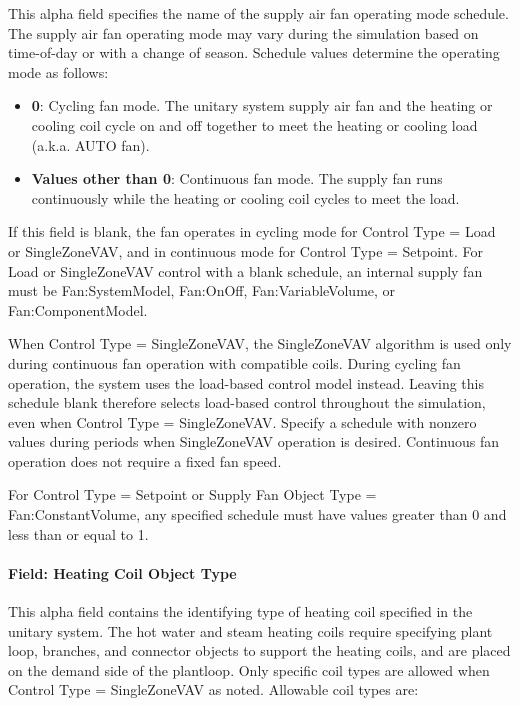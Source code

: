 This alpha field specifies the name of the supply air fan operating mode schedule. The supply air fan operating mode may vary during the simulation based on time-of-day or with a change of season. Schedule values determine the operating mode as follows:

\begin{itemize}
\item
  \textbf{0}: Cycling fan mode. The unitary system supply air fan and the heating or cooling coil cycle on and off together to meet the heating or cooling load (a.k.a. AUTO fan).
\item
  \textbf{Values other than 0}: Continuous fan mode. The supply fan runs continuously while the heating or cooling coil cycles to meet the load.
\end{itemize}

If this field is blank, the fan operates in cycling mode for Control Type = Load or SingleZoneVAV, and in continuous mode for Control Type = Setpoint. For Load or SingleZoneVAV control with a blank schedule, an internal supply fan must be Fan:SystemModel, Fan:OnOff, Fan:VariableVolume, or Fan:ComponentModel.

When Control Type = SingleZoneVAV, the SingleZoneVAV algorithm is used only during continuous fan operation with compatible coils. During cycling fan operation, the system uses the load-based control model instead. Leaving this schedule blank therefore selects load-based control throughout the simulation, even when Control Type = SingleZoneVAV. Specify a schedule with nonzero values during periods when SingleZoneVAV operation is desired. Continuous fan operation does not require a fixed fan speed.

For Control Type = Setpoint or Supply Fan Object Type = Fan:ConstantVolume, any specified schedule must have values greater than 0 and less than or equal to 1.

\paragraph{Field: Heating Coil Object Type}\label{field-heating-coil-object-type-002}

This alpha field contains the identifying type of heating coil specified in the unitary system. The hot water and steam heating coils require specifying plant loop, branches, and connector objects to support the heating coils, and are placed on the demand side of the plantloop. Only specific coil types are allowed when Control Type = SingleZoneVAV as noted. Allowable coil types are:

